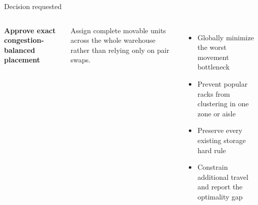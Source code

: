 \documentclass[aspectratio=169,10pt]{beamer}
\newcommand{\smallcaps}[1]{\textcolor{Slate}{\scriptsize\MakeUppercase{#1}}}
\newcommand{\pill}[2]{%
  \tikz[baseline=(X.base)]\node[
    rounded corners=2pt,fill=#1!12,text=#1,
    inner xsep=6pt,inner ysep=3pt,font=\scriptsize\bfseries
  ](X){#2};%
}
\begin{document}
\begin{frame}{Decision requested}
  \small
  \begin{columns}[T,onlytextwidth]
      {\large\bfseries Approve exact congestion-balanced placement}

      \vspace{0.18cm}
      Assign complete movable units across the whole warehouse rather than
      relying only on pair swaps.

      \vspace{0.18cm}
      \begin{itemize}
        \item Globally minimize the worst movement bottleneck
        \item Prevent popular racks from clustering in one zone or aisle
        \item Preserve every existing storage hard rule
        \item Constrain additional travel and report the optimality gap
      \end{itemize}

  \end{columns}
\end{frame}
\end{document}
